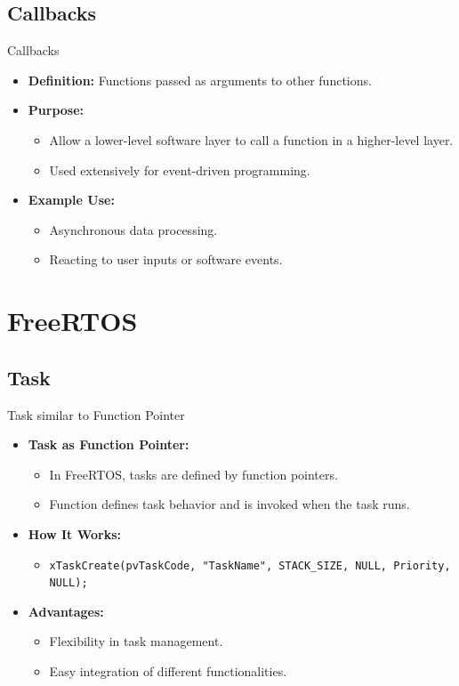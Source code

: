 \documentclass[10pt]{beamer}
\begin{document}
\subsection{Callbacks}
\begin{frame}{Callbacks}
  \begin{itemize}
    \item \textbf{Definition:} Functions passed as arguments to other functions.
    \item \textbf{Purpose:}
      \begin{itemize}
        \item Allow a lower-level software layer to call a function in a higher-level layer.
        \item Used extensively for event-driven programming.
      \end{itemize}
    \item \textbf{Example Use:}
      \begin{itemize}
        \item Asynchronous data processing.
        \item Reacting to user inputs or software events.
      \end{itemize}
  \end{itemize}
\end{frame}

\section{FreeRTOS}
\subsection{Task}
\begin{frame}{Task similar to Function Pointer}
  \begin{itemize}
    \item \textbf{Task as Function Pointer:}
      \begin{itemize}
        \item In FreeRTOS, tasks are defined by function pointers.
        \item Function defines task behavior and is invoked when the task runs.
      \end{itemize}
    \item \textbf{How It Works:}
      \begin{itemize}
        \item \texttt{xTaskCreate(pvTaskCode, "TaskName", STACK\_SIZE, NULL, Priority, NULL);}
      \end{itemize}
    \item \textbf{Advantages:}
      \begin{itemize}
        \item Flexibility in task management.
        \item Easy integration of different functionalities.
      \end{itemize}
  \end{itemize}
\end{frame}
\end{document}
